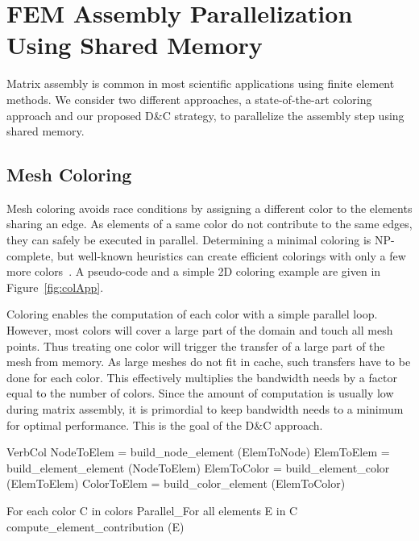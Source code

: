 \documentclass[10pt]{IOS-Book-Article}
\begin{document}
\section{FEM Assembly Parallelization Using Shared Memory}
\label{sec:assembly}

Matrix assembly is common in most scientific applications using finite element methods. 
We consider two different approaches, a state-of-the-art coloring approach and our
proposed D\&C strategy, to parallelize the assembly step using shared memory.


\subsection{Mesh Coloring}
\label{sec:col}
Mesh coloring avoids race conditions by assigning a different color to the elements sharing an edge.
As elements of a same color do not contribute to the same edges, they can safely be executed in parallel.
Determining a minimal coloring is NP-complete, but well-known heuristics can create efficient colorings
with only a few more colors~\cite{CPUfe}. A pseudo-code and a simple 2D coloring example are given in Figure~\ref{fig:colApp}.

Coloring enables the computation of each color with a simple parallel loop.
However, most colors will cover a large part of the domain and touch all mesh 
points. Thus treating one color will trigger the transfer of a large part
of the mesh from memory. As large meshes do not fit in cache, such transfers
have to be done for each color. This effectively multiplies the bandwidth needs by
a factor equal to the number of colors. Since the amount of computation is
usually low during matrix assembly, it is primordial to keep bandwidth needs
to a minimum for optimal performance. This is the goal of the D\&C approach.

\begin{SaveVerbatim}[]{VerbCol}
NodeToElem = build_node_element (ElemToNode)
ElemToElem = build_element_element (NodeToElem)
ElemToColor = build_element_color (ElemToElem)
ColorToElem = build_color_element (ElemToColor)

For each color C in colors
  Parallel_For all elements E in C
    compute_element_contribution (E)
\end{SaveVerbatim}
\end{document}
